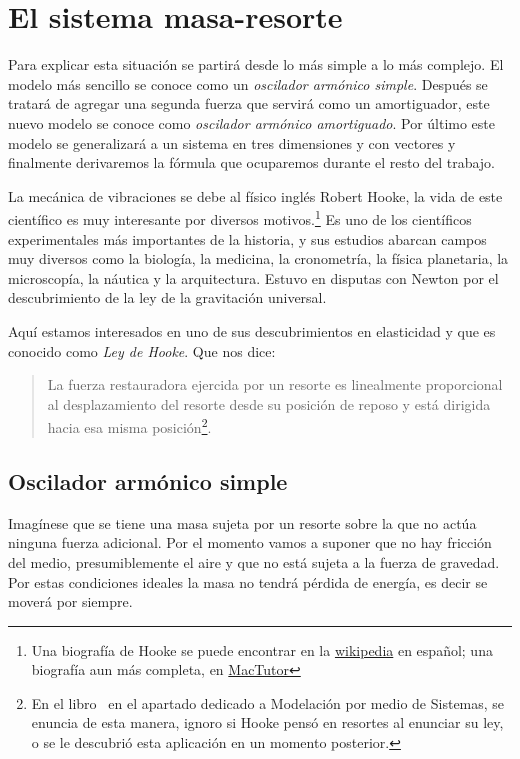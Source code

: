 \section{El sistema masa-resorte}

Para explicar esta situación se partirá desde lo más simple a lo más complejo.
El modelo más sencillo se conoce como un \emph{oscilador armónico simple}.
Después se tratará de agregar una segunda fuerza que servirá como un amortiguador, este nuevo modelo se conoce como \emph{oscilador armónico amortiguado}.
Por último este modelo se generalizará a un sistema en tres dimensiones y con vectores y finalmente derivaremos la fórmula que ocuparemos durante el resto del trabajo. 

La mecánica de vibraciones se debe al físico inglés Robert Hooke, la vida de este científico es muy interesante por diversos motivos.\footnote{Una biografía de Hooke se puede encontrar en la \href{https://es.wikipedia.org/wiki/Robert_Hooke}{wikipedia} en español; una biografía aun más completa, en \href{https://mathshistory.st-andrews.ac.uk/Biographies/Hooke/}{MacTutor}}
Es uno de los científicos experimentales más importantes de la historia,  y sus estudios abarcan campos muy diversos como la biología, la medicina, la cronometría, la física planetaria, la microscopía, la náutica y la arquitectura. 
Estuvo en disputas con Newton por el descubrimiento de la ley de la gravitación universal.

Aquí estamos interesados en uno de sus descubrimientos en elasticidad y que es conocido como \emph{Ley de Hooke}.
Que nos dice: 
\begin{quote}
La fuerza restauradora ejercida por un resorte es linealmente proporcional al desplazamiento del resorte desde su posición de reposo y está dirigida hacia esa misma posición\footnote{En el libro~\cite{Blanchard:Ecuaciones} en el apartado dedicado a Modelación por medio de Sistemas, se enuncia de esta manera, ignoro si Hooke pensó en resortes al enunciar su ley, o se le descubrió esta aplicación en un momento posterior.}.
\end{quote}

\subsection{Oscilador armónico simple}
Imagínese que se tiene una masa sujeta por un resorte sobre la que no actúa ninguna fuerza adicional.
Por el momento vamos a suponer que no hay fricción del medio, presumiblemente el aire y que no está sujeta a la fuerza de gravedad.
Por estas condiciones ideales la masa no tendrá pérdida de energía, es decir se moverá por siempre.

